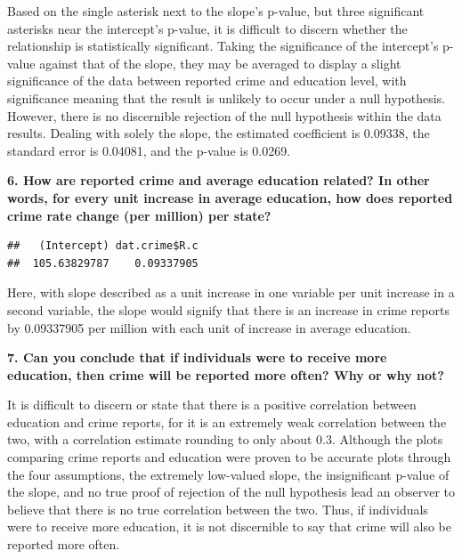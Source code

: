 \documentclass[
]{article}
\newenvironment{Shaded}{\begin{snugshade}}{\end{snugshade}}
\newcommand{\NormalTok}[1]{#1}
\newcommand{\SpecialCharTok}[1]{\textcolor[rgb]{0.00,0.00,0.00}{#1}}
\begin{document}
Based on the single asterisk next to the slope's p-value, but three
significant asterisks near the intercept's p-value, it is difficult to
discern whether the relationship is statistically significant. Taking
the significance of the intercept's p-value against that of the slope,
they may be averaged to display a slight significance of the data
between reported crime and education level, with significance meaning
that the result is unlikely to occur under a null hypothesis. However,
there is no discernible rejection of the null hypothesis within the data
results. Dealing with solely the slope, the estimated coefficient is
0.09338, the standard error is 0.04081, and the p-value is 0.0269.

\textbf{6. How are reported crime and average education related? In
other words, for every unit increase in average education, how does
reported crime rate change (per million) per state?}

\begin{Shaded}
\end{Shaded}

\begin{verbatim}
##   (Intercept) dat.crime$R.c 
##  105.63829787    0.09337905
\end{verbatim}

Here, with slope described as a unit increase in one variable per unit
increase in a second variable, the slope would signify that there is an
increase in crime reports by 0.09337905 per million with each unit of
increase in average education.

\textbf{7. Can you conclude that if individuals were to receive more
education, then crime will be reported more often? Why or why not?}

It is difficult to discern or state that there is a positive correlation
between education and crime reports, for it is an extremely weak
correlation between the two, with a correlation estimate rounding to
only about 0.3. Although the plots comparing crime reports and education
were proven to be accurate plots through the four assumptions, the
extremely low-valued slope, the insignificant p-value of the slope, and
no true proof of rejection of the null hypothesis lead an observer to
believe that there is no true correlation between the two. Thus, if
individuals were to receive more education, it is not discernible to say
that crime will also be reported more often.
\end{document}
